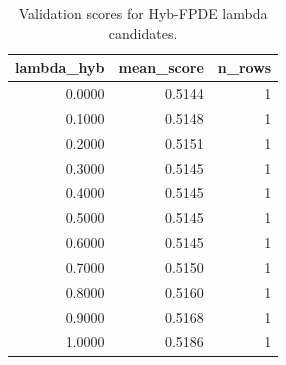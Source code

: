\begin{table}[t]
\caption{Validation scores for Hyb-FPDE lambda candidates.}
\label{tab:lambda_distribution_computed}
\centering
\begin{tabular}{rrr}
\toprule
lambda\_hyb & mean\_score & n\_rows \\
\midrule
0.0000 & 0.5144 & 1 \\
0.1000 & 0.5148 & 1 \\
0.2000 & 0.5151 & 1 \\
0.3000 & 0.5145 & 1 \\
0.4000 & 0.5145 & 1 \\
0.5000 & 0.5145 & 1 \\
0.6000 & 0.5145 & 1 \\
0.7000 & 0.5150 & 1 \\
0.8000 & 0.5160 & 1 \\
0.9000 & 0.5168 & 1 \\
1.0000 & 0.5186 & 1 \\
\bottomrule
\end{tabular}

\end{table}
